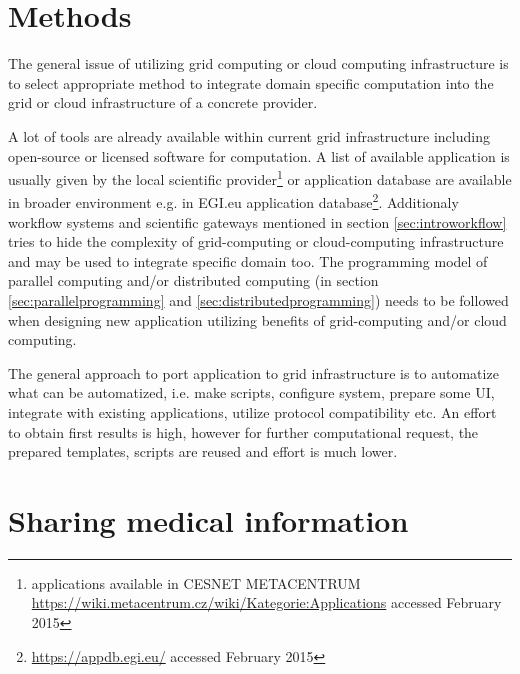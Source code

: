 \section{Methods}
\label{sec:methods}

The general issue of utilizing grid computing or cloud computing infrastructure is to select appropriate method to integrate domain specific computation into the grid or cloud infrastructure of a concrete provider. 

A lot of tools are already available within current grid infrastructure including open-source or licensed software for computation. A list of available application is usually given by the local scientific provider\footnote{applications available in CESNET METACENTRUM \url{https://wiki.metacentrum.cz/wiki/Kategorie:Applications} accessed February 2015} or application database are available in broader environment e.g. in EGI.eu application database\footnote{\url{https://appdb.egi.eu/} accessed February 2015}.
Additionaly workflow systems and scientific gateways mentioned in section \ref{sec:introworkflow} tries to hide the complexity of grid-computing or cloud-computing infrastructure and may be used to integrate specific domain too.
The programming model of parallel computing and/or distributed  computing (in section \ref{sec:parallelprogramming} and  \ref{sec:distributedprogramming}) needs to be followed when designing new application utilizing benefits of grid-computing and/or cloud computing.

The general approach to port application to grid infrastructure is to automatize what can be automatized, i.e. make scripts, configure system, prepare some UI, integrate with existing applications, utilize protocol compatibility etc. An effort to obtain first results is high, however for further computational request, the prepared templates, scripts are reused and effort is much lower.  

\section{Sharing medical information}
\label{sec:imaging}



